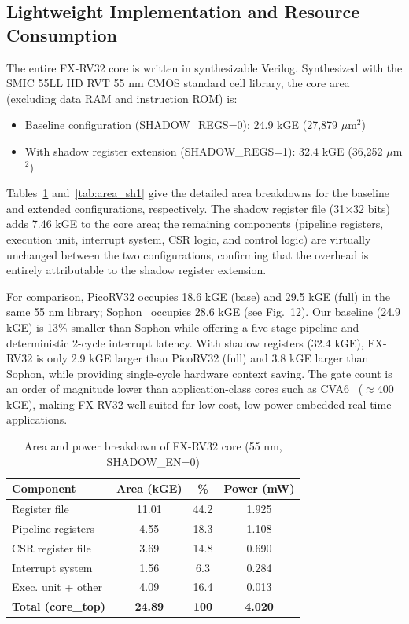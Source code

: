 \documentclass[letterpaper,journal]{IEEEtran}
\begin{document}
\subsection{Lightweight Implementation and Resource Consumption}
The entire FX-RV32 core is written in synthesizable Verilog.
Synthesized with the SMIC 55LL HD RVT 55 nm CMOS standard cell library, the core area (excluding data RAM and instruction ROM) is:
\begin{itemize}
\item Baseline configuration (SHADOW\_REGS=0): 24.9 kGE (27,879 $\mu$m$^2$)
\item With shadow register extension (SHADOW\_REGS=1): 32.4 kGE (36,252 $\mu$m$^2$)
\end{itemize}
Tables~\ref{tab:area_en0} and~\ref{tab:area_sh1} give the detailed area breakdowns for the baseline and extended configurations, respectively.
The shadow register file (31$\times$32 bits) adds 7.46 kGE to the core area; the remaining components (pipeline registers, execution unit, interrupt system, CSR logic, and control logic) are virtually unchanged between the two configurations, confirming that the overhead is entirely attributable to the shadow register extension.

For comparison, PicoRV32 occupies 18.6 kGE (base) and 29.5 kGE (full) in the same 55 nm library; Sophon~\cite{ref1} occupies 28.6 kGE (see Fig.~12).
Our baseline (24.9 kGE) is 13\% smaller than Sophon while offering a five-stage pipeline and deterministic 2-cycle interrupt latency.
With shadow registers (32.4 kGE), FX-RV32 is only 2.9 kGE larger than PicoRV32 (full) and 3.8 kGE larger than Sophon, while providing single-cycle hardware context saving.
The gate count is an order of magnitude lower than application-class cores such as CVA6~\cite{ref31} ($\approx$400 kGE), making FX-RV32 well suited for low-cost, low-power embedded real-time applications.

\begin{table}[t]
\centering
\caption{Area and power breakdown of FX-RV32 core (55 nm, SHADOW\_EN=0)}
\label{tab:area_en0}
\footnotesize
\setlength{\tabcolsep}{2pt}
\begin{tabular}{@{}lccc@{}}
\toprule
\textbf{Component} & \textbf{Area (kGE)} & \textbf{\%} & \textbf{Power (mW)} \\
\midrule
Register file       & 11.01 & 44.2 & 1.925 \\
Pipeline registers  & 4.55  & 18.3 & 1.108 \\
CSR register file   & 3.69  & 14.8 & 0.690 \\
Interrupt system    & 1.56  & 6.3  & 0.284 \\
Exec. unit + other  & 4.09  & 16.4 & 0.013 \\
\midrule
\textbf{Total (core\_top)} & \textbf{24.89} & \textbf{100} & \textbf{4.020} \\
\bottomrule
\end{tabular}
\end{table}
\end{document}
